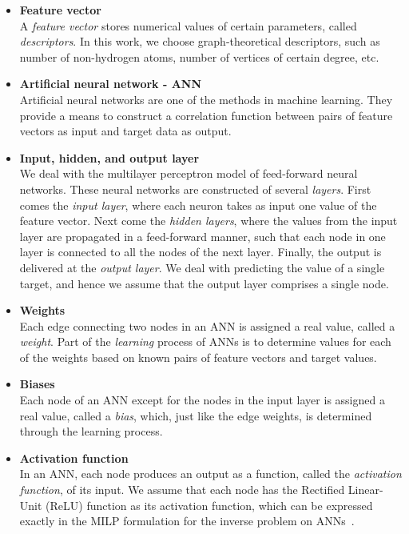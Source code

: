 \documentclass[11pt, titlepage, dvipdfmx, twoside]{article}
\begin{document}
\begin{itemize}

\item {\bf Feature vector}\\
%
A {\em feature vector} stores numerical values of certain parameters,
called {\em descriptors}.
In this work, we choose graph-theoretical descriptors, such as number of 
non-hydrogen atoms, number of vertices of certain degree, etc.

\item {\bf Artificial neural network - ANN}\\
%
Artificial neural networks are one of the methods in machine learning.
They provide a means to construct a correlation function between 
pairs of feature vectors as input and target data as output.


\item {\bf Input, hidden, and output layer}\\
%
We deal with the multilayer perceptron model 
of feed-forward neural networks.
These neural networks are constructed of several {\em layers}.
First comes the \emph{input layer}, where each neuron takes as input
one value of the feature vector.
Next come the \emph{hidden layers}, where the 
values from the input layer are propagated in a feed-forward manner,
such that each node in one layer is connected to all the nodes of the next layer. 
Finally, the output is delivered at the \emph{output layer}.
We deal with predicting the value of a single target,
and hence we assume that the output layer comprises a single node.

\item {\bf Weights}\\
%
Each edge connecting two nodes in an ANN is assigned a real value,
called a \emph{weight}.
Part of the \emph{learning} process of ANNs is to determine values for each of the weights
based on known pairs of feature vectors and target values.

\item {\bf Biases}\\
Each node of an ANN except for the nodes in the input layer
is assigned a real value, called a {\em bias},
which, just like the edge weights, is determined through the learning process.


\item {\bf Activation function}\\
%
In an ANN, each node produces an output as a function, called the \emph{activation function}, 
of its input.
We assume that each node has the Rectified Linear-Unit (ReLU) function 
as its activation function,
which can be expressed exactly in the MILP formulation
for the inverse problem on ANNs~\cite{AN19}.


\end{itemize}
\end{document}

